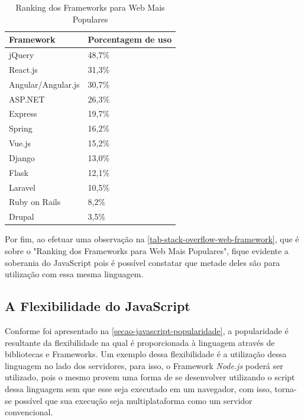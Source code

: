 \begin{table}[htb]
\ABNTEXfontereduzida
\caption[Ranking dos Frameworks para Web Mais Populares]{Ranking dos Frameworks para Web Mais Populares}
\label{tab-stack-overflow-web-framework}
\begin{tabular}{p{5cm}|p{4cm}}
   \textbf{Framework} & \textbf{Porcentagem de uso}  \\
    \hline
    jQuery & 48,7\%  \\
    \hline
    React.js & 31,3\%  \\
    \hline
    Angular/Angular.js & 30,7\%  \\
    \hline
    ASP.NET & 26,3\%  \\
    \hline
    Express & 19,7\%  \\
    \hline
    Spring & 16,2\%  \\
    \hline
    Vue.js & 15,2\%  \\
    \hline
    Django & 13,0\%  \\
    \hline
    Flask & 12,1\%  \\
    \hline
    Laravel & 10,5\%  \\
    \hline
    Ruby on Rails & 8,2\%  \\
    \hline
    Drupal & 3,5\%  \\
\end{tabular}
\end{table}

Por fim, ao efetuar uma observação na \autoref{tab-stack-overflow-web-framework}, que é sobre o "Ranking dos Frameworks para Web Mais Populares", fique evidente a soberania do JavaScript pois é possível constatar que metade deles são para utilização com essa mesma linguagem.

\subsection{A Flexibilidade do JavaScript}
\label{sec-javascript-flexibilidade}

Conforme foi apresentado na \autoref{secao-javascript-popularidade}, a popularidade é resultante da flexibilidade na qual é proporcionada à linguagem através de bibliotecas e Frameworks. Um exemplo dessa flexibilidade é a utilização dessa linguagem no lado dos servidores, para isso, o Framework \textit{Node.js} poderá ser utilizado, pois o mesmo provem uma forma de se desenvolver utilizando o script dessa linguagem sem que esse seja executado em um navegador, com isso, torna-se possível que sua execução seja multiplataforma como um servidor convencional.

